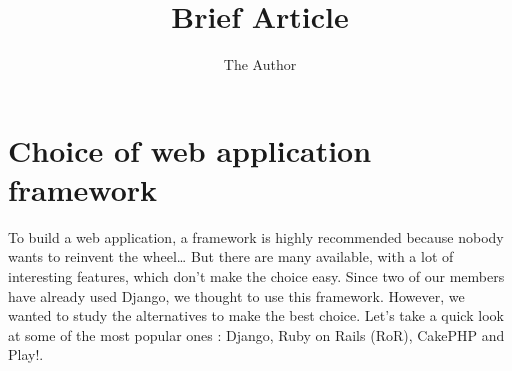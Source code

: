 \documentclass[11pt, a4paper]{article}   	%
\title{Brief Article}
\author{The Author}
\begin{document}

\section{Choice of web application framework}

To build a web application, a framework is highly recommended because nobody wants to reinvent the wheel\dots
But there are many available, with a lot of interesting features, which don't make the choice easy. Since two of our members have already used Django, we thought to use this framework. However, we wanted to study the alternatives to make the best choice. Let's take a quick look at some of the most popular ones : Django, Ruby on Rails (RoR), CakePHP and Play!.
\end{document}
